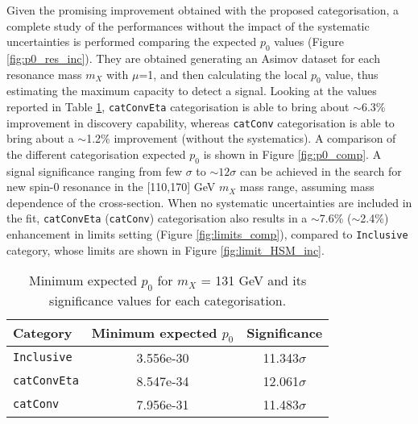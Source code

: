 \documentclass[a4paper, oneside, 11pt, openright]{book}
\begin{document}
 			Given the promising improvement obtained with the proposed categorisation, a complete study of the performances without the impact of the systematic uncertainties is performed comparing the expected  $p_0$ values (Figure \ref{fig:p0_res_inc}). They are obtained generating an Asimov dataset for each resonance mass $m_X$ with $\mu$=1, and then calculating the local $p_0$ value, thus estimating the maximum capacity to detect a signal. %
 			Looking at the values reported in Table \ref{tab:p0_imp}, \texttt{catConvEta} categorisation  is able to bring about $\sim$6.3\% improvement in discovery capability, whereas \texttt{catConv} categorisation is able to bring about a $\sim$1.2\% improvement (without the systematics). 
 			A comparison of the different categorisation expected $p_0$ is shown in Figure \ref{fig:p0_comp}. A signal significance ranging from few $\sigma$ to $\sim12\sigma$ can be achieved in the search for new spin-0 resonance in the [110,170] GeV $m_X$ mass range, assuming mass dependence of the cross-section.  When no systematic uncertainties are included in the fit, \texttt{catConvEta} (\texttt{catConv}) categorisation also results in a $\sim$7.6\% ($\sim$2.4\%) enhancement in limits setting (Figure \ref{fig:limits_comp}), compared to \texttt{Inclusive} category, whose limits are shown in Figure \ref{fig:limit_HSM_inc}.
 			\begin{table}[tbp]
				\centering
				\begin{tabular}{lcc}
					\toprule[1.5pt]
					Category 			& Minimum expected $p_0$ 	& Significance		\\
					\midrule
					\texttt{Inclusive}	& 3.556e-30					& 11.343$\sigma$	\\
					\texttt{catConvEta}	& 8.547e-34					& 12.061$\sigma$	\\
					\texttt{catConv}	& 7.956e-31					& 11.483$\sigma$ 	\\
					\bottomrule[1.5pt]
				\end{tabular}
 				\caption{Minimum expected $p_0$ for $m_X$ = 131 GeV and its significance values for each categorisation.}
 				\label{tab:p0_imp}
 			\end{table}
\end{document}
